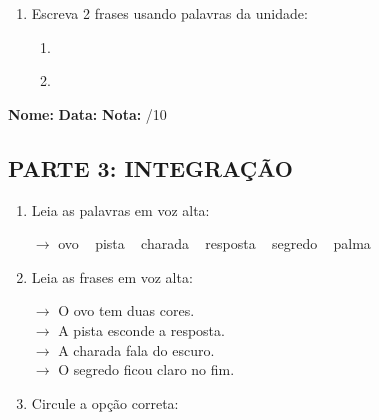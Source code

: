 \begin{exercicio}
\begin{enumerate}[resume]
  \item Escreva 2 frases usando palavras da unidade:
  \begin{enumerate}[label=\alph*)]
    \item \underline{\hspace{8cm}}
    \item \underline{\hspace{8cm}}
  \end{enumerate}

\end{enumerate}

\end{exercicio}



\begin{exercicio}

\noindent\textbf{Nome:} \underline{\hspace{3.2cm}} \quad \textbf{Data:} \underline{\hspace{1.6cm}} \quad \textbf{Nota:} \underline{\hspace{0.9cm}}/10


\subsection*{PARTE 3: INTEGRAÇÃO}

\begin{enumerate}[resume]

  \item Leia as palavras em voz alta:
  \begin{center}
  $\rightarrow$ ovo ~ pista ~ charada ~ resposta ~ segredo ~ palma
  \end{center}

  \item Leia as frases em voz alta:
  \begin{center}
  $\rightarrow$ O ovo tem duas cores.\\
  $\rightarrow$ A pista esconde a resposta.\\
  $\rightarrow$ A charada fala do escuro.\\
  $\rightarrow$ O segredo ficou claro no fim.\\
  \end{center}

  \item Circule a opção correta:
  \begin{enumerate}[label=(\alph*)]


\end{enumerate}
\end{enumerate}
\end{exercicio}
